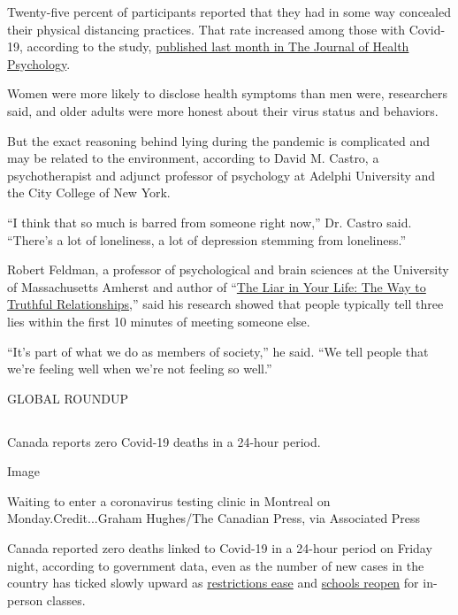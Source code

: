 Twenty-five percent of participants reported that they had in some way
concealed their physical distancing practices. That rate increased among
those with Covid-19, according to the study,
\href{https://journals.sagepub.com/doi/10.1177/1359105320951603}{published
last month in The Journal of Health Psychology}.

Women were more likely to disclose health symptoms than men were,
researchers said, and older adults were more honest about their virus
status and behaviors.

But the exact reasoning behind lying during the pandemic is complicated
and may be related to the environment, according to David M. Castro, a
psychotherapist and adjunct professor of psychology at Adelphi
University and the City College of New York.

``I think that so much is barred from someone right now,'' Dr. Castro
said. ``There's a lot of loneliness, a lot of depression stemming from
loneliness.''

Robert Feldman, a professor of psychological and brain sciences at the
University of Massachusetts Amherst and author of
``\href{https://www.hachettebookgroup.com/titles/robert-feldman/the-liar-in-your-life/9780446552196/}{The
Liar in Your Life: The Way to Truthful Relationships},'' said his
research showed that people typically tell three lies within the first
10 minutes of meeting someone else.

``It's part of what we do as members of society,'' he said. ``We tell
people that we're feeling well when we're not feeling so well.''

GLOBAL ROUNDUP

\hypertarget{-6}{%
\subsection{}\label{-6}}

Canada reports zero Covid-19 deaths in a 24-hour period.

Image

Waiting to enter a coronavirus testing clinic in Montreal on
Monday.Credit...Graham Hughes/The Canadian Press, via Associated Press

Canada reported zero deaths linked to Covid-19 in a 24-hour period on
Friday night, according to government data, even as the number of new
cases in the country has ticked slowly upward as
\href{https://www.nytimes3xbfgragh.onion/2020/06/26/world/canada/canada-reopens-but-little-returns-to-the-old-ways.html}{restrictions
ease} and
\href{https://www.nytimes3xbfgragh.onion/reuters/2020/09/03/us/03reuters-health-coronavirus-canada-education.html}{schools
reopen} for in-person classes.

